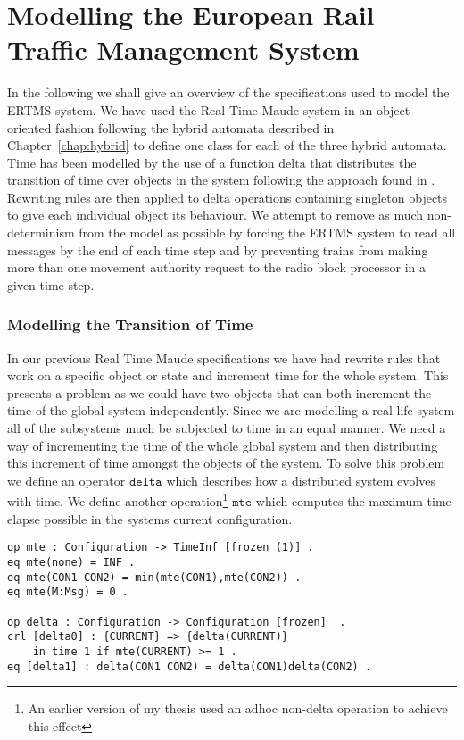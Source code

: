 \section{Modelling the European Rail Traffic Management System}
In the following we shall give an overview of the specifications used to model the ERTMS system. We have used the Real Time Maude system in an object oriented fashion following the hybrid automata described in Chapter~\ref{chap:hybrid} to define one class for each of the three hybrid automata. Time has been modelled by the use of a function $\mathrm{delta}$ that distributes the transition of time over objects in the system following the approach found in \cite{PO07}. Rewriting rules are then applied to $\mathrm{delta}$ operations containing singleton objects to give each individual object its behaviour. We attempt to remove as much non-determinism from the model as possible by forcing the ERTMS system to read all messages by the end of each time step and by preventing trains from making more than one movement authority request to the radio block processor in a given time step.


\subsubsection*{Modelling the Transition of Time} \label{sec:maudetimemodelling}
In our previous Real Time Maude specifications we have had rewrite rules that work on a specific object or state and increment time for the whole system. This presents a problem as we could have two objects that can both increment the time of the global system independently.  Since we are modelling a real life system all of the subsystems much be subjected to time in an equal manner. We need a way of incrementing the time of the whole global system and then distributing this increment of time amongst the objects of the system. To solve this problem we define an operator $\texttt{delta}$ \cite{PO07} which describes how a distributed system evolves with time. We define another operation\footnote{An earlier version of my thesis used an adhoc non-delta operation to achieve this effect} $\texttt{mte}$ which computes the maximum time elapse possible in the systems current configuration.

\begin{lstlisting}[caption = The delta and mte operations, label = code:delta]
op mte : Configuration -> TimeInf [frozen (1)] .
eq mte(none) = INF .
eq mte(CON1 CON2) = min(mte(CON1),mte(CON2)) .
eq mte(M:Msg) = 0 .

op delta : Configuration -> Configuration [frozen]  . 
crl [delta0] : {CURRENT} => {delta(CURRENT)} 
    in time 1 if mte(CURRENT) >= 1 .
eq [delta1] : delta(CON1 CON2) = delta(CON1)delta(CON2) .
\end{lstlisting}

